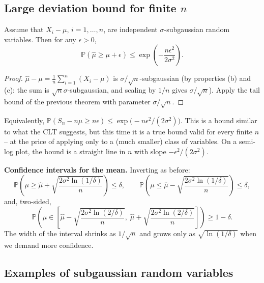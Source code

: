 \subsection{Large deviation bound for finite $n$}

\begin{theorem}
Assume that $X_i - \mu$, $i = 1,\dots,n$, are independent $\sigma$-subgaussian random variables. Then for any $\epsilon > 0$,
\[
\mathbb{P}(\hat{\mu} \geq \mu + \epsilon) \leq \exp\left(-\frac{n\epsilon^2}{2\sigma^2}\right).
\]
\end{theorem}

\begin{proof}
$\hat{\mu} - \mu = \frac{1}{n}\sum_{i=1}^n (X_i - \mu)$ is $\sigma/\sqrt{n}$-subgaussian (by properties (b) and (c): the sum is $\sqrt{n}\sigma$-subgaussian, and scaling by $1/n$ gives $\sigma/\sqrt{n}$). Apply the tail bound of the previous theorem with parameter $\sigma/\sqrt{n}$.
\end{proof}

Equivalently, $\mathbb{P}(S_n - n\mu \geq n\epsilon) \leq \exp\big(-n\epsilon^2/(2\sigma^2)\big)$. This is a bound similar to what the CLT suggests, but this time it is a true bound valid for every finite $n$ -- at the price of applying only to a (much smaller) class of variables. On a semi-log plot, the bound is a straight line in $n$ with slope $-\epsilon^2/(2\sigma^2)$.

\textbf{Confidence intervals for the mean.} Inverting as before:
\[
\mathbb{P}\left(\mu \geq \hat{\mu} + \sqrt{\frac{2\sigma^2\ln(1/\delta)}{n}}\right) \leq \delta, \qquad \mathbb{P}\left(\mu \leq \hat{\mu} - \sqrt{\frac{2\sigma^2\ln(1/\delta)}{n}}\right) \leq \delta,
\]
and, two-sided,
\[
\mathbb{P}\left(\mu \in \left[\hat{\mu} - \sqrt{\frac{2\sigma^2\ln(2/\delta)}{n}},\; \hat{\mu} + \sqrt{\frac{2\sigma^2\ln(2/\delta)}{n}}\right]\right) \geq 1 - \delta.
\]
The width of the interval shrinks as $1/\sqrt{n}$ and grows only as $\sqrt{\ln(1/\delta)}$ when we demand more confidence.

\subsection{Examples of subgaussian random variables}


